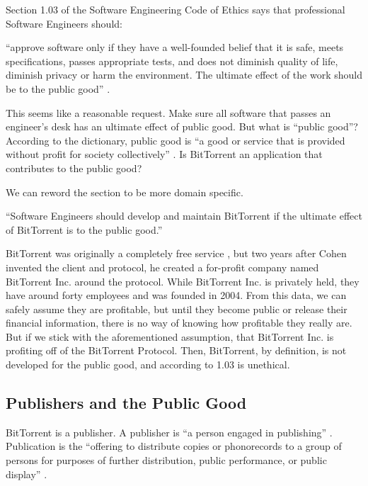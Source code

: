 \documentclass[11pt]{article}
\begin{document}
\begin{multicols}{2}
Section 1.03 of the Software Engineering Code of Ethics says that professional Software Engineers should:

{\addtolength{\leftskip}{6mm}

\noindent ``approve software only if they have a well-founded belief that it is safe, meets specifications, passes appropriate tests, and does not diminish quality of life, diminish privacy or harm the environment. The ultimate effect of the work should be to the public good'' \cite[1.03]{secode}.

}

This seems like a reasonable request. Make sure all software that passes an engineer's desk has an ultimate effect of public good. But what is ``public good''? According to the dictionary, public good is ``a good or service that is provided without profit for society collectively'' \cite{pubgooddef}. Is BitTorrent an application that contributes to the public good?

We can reword the section to be more domain specific. 

{\addtolength{\leftskip}{6mm}

``Software Engineers should develop and maintain BitTorrent if the ultimate effect of BitTorrent is to the public good.''

}

BitTorrent was originally a completely free service \cite{btannounce}, but two years after Cohen invented the client and protocol, he created a for-profit company named BitTorrent Inc. around the protocol. While BitTorrent Inc. is privately held, they have around forty employees and was founded in 2004. From this data, we can safely assume they are profitable, but until they become public or release their financial information, there is no way of knowing how profitable they really are. But if we stick with the aforementioned assumption, that BitTorrent Inc. is profiting off of the BitTorrent Protocol. Then, BitTorrent, by definition, is not developed for the public good, and according to 1.03 is unethical.

\subsection{Publishers and the Public Good}

BitTorrent is a publisher. A publisher is ``a person engaged in publishing'' \cite{publisher}. Publication is the ``offering to distribute copies or phonorecords to a group of persons for purposes of further distribution, public performance, or public display'' \cite{publish}.


\end{multicols}
\end{document}
